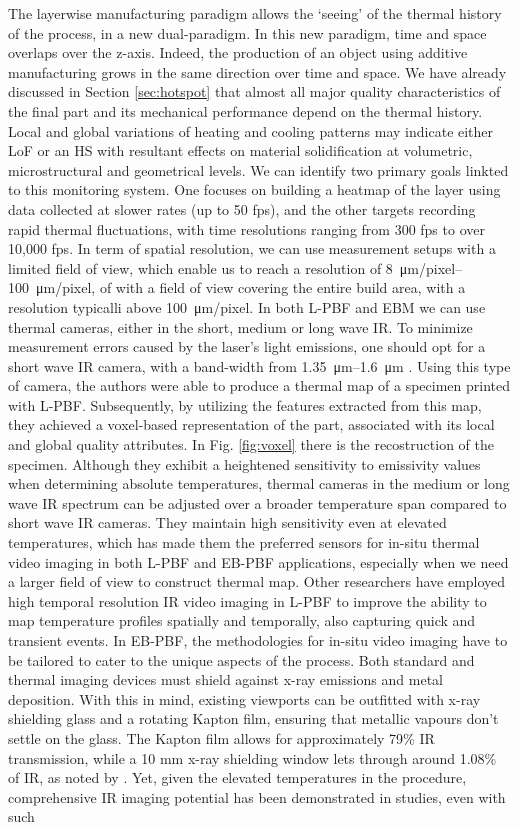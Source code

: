The layerwise manufacturing paradigm allows the ‘seeing’ of the thermal history of the process, in a new dual-paradigm. In this new paradigm, time and space overlaps over the z-axis. Indeed, the production of an object using additive manufacturing grows in the same direction over time and space. We have already discussed in Section \ref{sec:hotspot} that almost all major quality characteristics of the final part and its mechanical performance depend on the thermal history. Local and global variations of heating and cooling patterns may indicate either LoF or an HS with resultant effects on material solidification at volumetric, microstructural and geometrical levels. We can identify two primary goals linkted to this monitoring system. One focuses on building a heatmap of the layer using data collected at slower rates (up to 50 fps), and the other targets recording rapid thermal fluctuations, with time resolutions ranging from 300 fps to over 10,000 fps. In term of spatial resolution, we can use measurement setups with a limited field of view, which enable us to reach a resolution of \SIrange{8}{100}{\micro\metre / pixel}, of with a field of view covering the entire build area, with a resolution typicalli above \SI{100}{\micro\metre / pixel}. In both L-PBF and EBM we can use thermal cameras, either in the short, medium or long wave IR. To minimize measurement errors caused by the laser's light emissions, one should opt for a short wave IR camera, with a band-width from \SIrange{1.35}{1.6}{\micro\metre} \cite{heigel_situ_2020}. Using this type of camera, the authors were able to produce a thermal map of a specimen printed with L-PBF. Subsequently, by utilizing the features extracted from this map, they achieved a voxel-based representation of the part, associated with its local and global quality attributes. In Fig. \ref{fig:voxel} there is the recostruction of the specimen. Although they exhibit a heightened sensitivity to emissivity values when determining absolute temperatures, thermal cameras in the medium or long wave IR spectrum can be adjusted over a broader temperature span compared to short wave IR cameras. They maintain high sensitivity even at elevated temperatures, which has made them the preferred sensors for in-situ thermal video imaging in both L-PBF and EB-PBF applications, especially when we need a larger field of view to construct thermal map.  Other researchers have employed high temporal resolution IR video imaging in L-PBF to improve the ability to map temperature profiles spatially and temporally, also capturing quick and transient events. In EB-PBF, the methodologies for in-situ video imaging have to be tailored to cater to the unique aspects of the process. Both standard and thermal imaging devices must shield against x-ray emissions and metal deposition. With this in mind, existing viewports can be outfitted with x-ray shielding glass and a rotating Kapton film, ensuring that metallic vapours don't settle on the glass. The Kapton film allows for approximately 79\% IR transmission, while a 10 mm x-ray shielding window lets through around 1.08\% of IR, as noted by \cite{ralph_b_dinwiddie_thermographic_2013}. Yet, given the elevated temperatures in the procedure, comprehensive IR imaging potential has been demonstrated in studies, even with such 